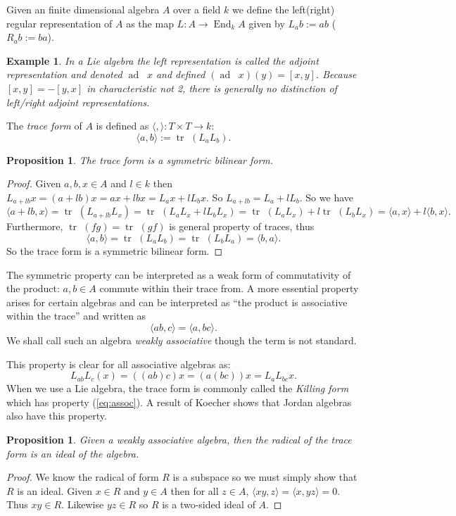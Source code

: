 \documentclass[12pt]{article}
\DeclareMathOperator{\End}{End}
\DeclareMathOperator{\ad}{ad~}
\DeclareMathOperator{\tr}{tr~}
\newtheorem{prop}[thm]{Proposition}
\newtheorem{ex}[thm]{Example}
\begin{document}
Given an finite dimensional algebra $A$ over a field $k$ we define the 
left(right) regular representation of $A$ as the map $L:A\rightarrow \End_k A$
given by $L_a b:=ab$ ($R_a b:=ba$).  

\begin{ex}
In a Lie algebra the left representation is called the \emph{adjoint}
representation and denoted $\ad~x$ and defined $(\ad~x)(y)=[x,y]$.  Because
$[x,y]=-[y,x]$ in characteristic not 2, there is generally no distinction of
left/right adjoint representations.
\end{ex}

The \emph{trace form} of $A$ is defined as 
$\langle,\rangle:T\times T\rightarrow k$:
  \[\langle a,b\rangle:=\tr(L_a L_b).\]

\begin{prop}
The trace form is a symmetric bilinear form.
\end{prop}
\begin{proof}
Given $a,b,x\in A$ and $l\in k$ then $L_{a+lb} x=(a+lb)x=ax+lbx=L_{a}x+lL_{b}x$.
So $L_{a+lb}=L_a+lL_b$.  So we have
   \[\langle a+lb,x\rangle=\tr(L_{a+lb}L_x)=\tr(L_a L_x+lL_b L_x)
            =\tr(L_a L_x)+l\tr(L_b L_x)=\langle a,x\rangle
                      +l\langle b,x\rangle.\]
Furthermore, $\tr(fg)=\tr(gf)$ is general property of traces, thus
  \[\langle a,b\rangle=\tr(L_a L_b)=\tr(L_bL_a)=\langle b,a\rangle.\]
So the trace form is a symmetric bilinear form.
\end{proof}

The symmetric property can be interpreted as a weak form of commutativity of
the product: $a,b\in A$ commute within their trace from.  A more essential
property arises for certain algebras and can be interpreted as ``the product
is associative within the trace'' and written as
\begin{equation}\label{eq:assoc}
\langle ab,c\rangle=\langle a,bc\rangle.
\end{equation}
We shall call such an algebra \emph{weakly associative} though the term is not standard.

This property is clear for all associative algebras as:
\[L_{ab}L_c(x)=((ab)c)x=(a(bc))x=L_a L_{bc} x.\]
When we use a Lie algebra, the trace form is commonly called the \emph{Killing form} which has property (\ref{eq:assoc}).  A result of Koecher shows that Jordan algebras also have this property.

\begin{prop}
Given a weakly associative algebra, then the radical of the trace form
is an ideal of the algebra. 
\end{prop}
\begin{proof}
We know the radical of form $R$ is a subspace so we must simply show that
$R$ is an ideal.  Given $x\in R$ and $y\in A$ then for all $z\in A$,
$\langle xy,z\rangle=\langle x,yz\rangle=0$.  Thus $xy\in R$.  Likewise
$yz\in R$ so $R$ is a two-sided ideal of $A$.
\end{proof}
\end{document}
